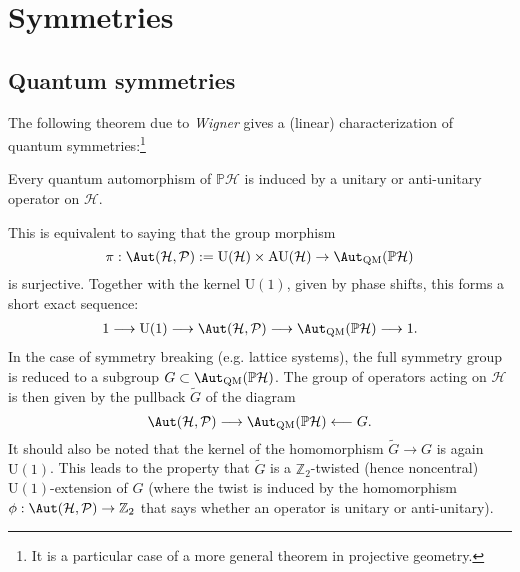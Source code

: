 \section{Symmetries}
\subsection{Quantum symmetries}



    The following theorem due to \textit{Wigner} gives a (linear) characterization of quantum symmetries:\footnote{It is a particular case of a more general theorem in projective geometry.}
    \begin{theorem}[Wigner]
        Every quantum automorphism of $\mathbb{P}\mathcal{H}$ is induced by a unitary or anti-unitary operator on $\mathcal{H}$.
    \end{theorem}
    This is equivalent to saying that the group morphism \[\pi:\Aut(\mathcal{H},\mathcal{P}):=\mathrm{U}(\mathcal{H})\times\mathrm{AU}(\mathcal{H})\rightarrow\Aut_\mathrm{QM}(\mathbb{P}\mathcal{H})\] is surjective. Together with the kernel $\mathrm{U}(1)$, given by phase shifts, this forms a short exact sequence:
    \begin{gather}
        1\longrightarrow\mathrm{U}(1)\longrightarrow\Aut(\mathcal{H},\mathcal{P})\longrightarrow\Aut_\mathrm{QM}(\mathbb{P}\mathcal{H})\longrightarrow1.
    \end{gather}
    In the case of symmetry breaking (e.g. lattice systems), the full symmetry group is reduced to a subgroup $G\subset\Aut_\mathrm{QM}(\mathbb{P}\mathcal{H})$. The group of operators acting on $\mathcal{H}$ is then given by the pullback $\widetilde{G}$ of the diagram \[\Aut(\mathcal{H}, \mathcal{P})\longrightarrow\Aut_\mathrm{QM}(\mathbb{P}\mathcal{H})\longleftarrow G.\] It should also be noted that the kernel of the homomorphism $\widetilde{G}\rightarrow G$ is again $\mathrm{U}(1)$. This leads to the property that $\widetilde{G}$ is a $\mathbb{Z}_2$-twisted (hence noncentral) $\mathrm{U}(1)$-extension of $G$ (where the twist is induced by the homomorphism $\phi:\Aut(\mathcal{H},\mathcal{P})\rightarrow\mathbb{Z}_2$ that says whether an operator is unitary or anti-unitary).

